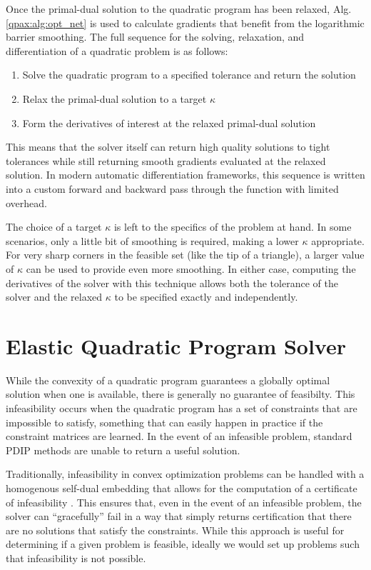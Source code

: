 Once the primal-dual solution to the quadratic program has been relaxed, Alg. \eqref{qpax:alg:opt_net} is used to calculate gradients that benefit from the logarithmic barrier smoothing. The full sequence for the solving, relaxation, and differentiation of a quadratic problem is as follows:
\begin{enumerate}
    \item Solve the quadratic program to a specified tolerance and return the solution
    \item Relax the primal-dual solution to a target $\kappa$
    \item Form the derivatives of interest at the relaxed primal-dual solution
\end{enumerate}
This means that the solver itself can return high quality solutions to tight tolerances while still returning smooth gradients evaluated at the relaxed solution. In modern automatic differentiation frameworks, this sequence is written into a custom forward and backward pass through the function with limited overhead.

The choice of a target $\kappa$ is left to the specifics of the problem at hand. In some scenarios, only a little bit of smoothing is required, making a lower $\kappa$ appropriate. For very sharp corners in the feasible set (like the tip of a triangle), a larger value of $\kappa$ can be used to provide even more smoothing. In either case, computing the derivatives of the solver with this technique allows both the tolerance of the solver and the relaxed $\kappa$ to be specified exactly and independently.
%
%
%
%
%
%
\section{Elastic Quadratic Program Solver}
%
%
%
%
While the convexity of a quadratic program guarantees a globally optimal solution when one is available, there is generally no guarantee of feasibilty. This infeasibility occurs when the quadratic program has a set of constraints that are impossible to satisfy, something that can easily happen in practice if the constraint matrices are learned. In the event of an infeasible problem, standard PDIP methods are unable to return a useful solution.

Traditionally, infeasibility in convex optimization problems can be handled with a homogenous self-dual embedding that allows for the computation of a certificate of infeasibility \cite{domahidi2013,vandenberghe,stellato}. This ensures that, even in the event of an infeasible problem, the solver can ``gracefully'' fail in a way that simply returns certification that there are no solutions that satisfy the constraints. While this approach is useful for determining if a given problem is feasible, ideally we would set up problems such that infeasibility is not possible.

